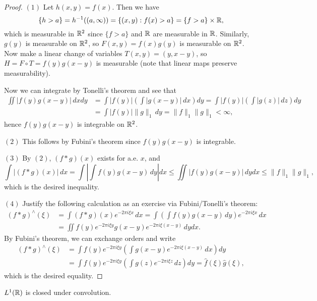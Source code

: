 \begin{proof}
  $(1)$ Let $h(x, y) = f(x)$. Then we have
  \[
    \{h > a\} = h^{-1}((a, \infty))
    = \{(x, y) : f(x) > a\}
    = \{f > a\} \times \mathbb{R},
  \]
  which is measurable in $\mathbb{R}^2$ since
  $\{f > a\}$ and $\mathbb{R}$ are measurable in
  $\mathbb{R}$. Similarly,
  $g(y)$ is measurable on $\mathbb{R}^2$, so
  $F(x, y) = f(x) g(y)$ is measurable
  on $\mathbb{R}^2$. Now make a linear change
  of variables $T(x, y) = (y, x - y)$,
  so $H = F \circ T = f(y) g(x - y)$ is
  measurable (note that linear maps
  preserve measurability).

  Now we can integrate by Tonelli's
  theorem and see that
  \begin{align*}
    \iint |f(y) g(x - y)|\, dx dy
    &= \int |f(y)| \left(\int |g(x - y)|\, dx\right) dy
    = \int |f(y)| \left(\int |g(z)|\, dz\right) dy \\
    &= \int |f(y)| \|g\|_1\, dy
    = \|f\|_1 \|g\|_1 < \infty,
  \end{align*}
  hence $f(y) g(x - y)$ is integrable
  on $\mathbb{R}^2$.

  $(2)$ This follows by Fubini's theorem
  since $f(y) g(x - y)$ is integrable.

  $(3)$ By $(2)$, $(f * g)(x)$ exists
  for a.e. $x$, and
  \[
    \int |(f * g)(x)|\, dx
    = \int \left|\int f(y) g(x - y)\, dy\right| dx
    \le \iint |f(y) g(x - y)|\, dy dx
    \le \|f\|_1 \|g\|_1,
  \]
  which is the desired inequality.

  $(4)$ Justify the following calculation
  as an exercise via Fubini/Tonelli's theorem:
  \begin{align*}
    (f * g)^\wedge(\xi)
    &= \int (f * g)(x) e^{-2\pi i \xi x}\, dx
    = \int \left(\int f(y) g(x - y)\, dy\right) e^{-2\pi i \xi x}\, dx \\
    &= \iint f(y) e^{-2\pi i \xi y}
    g(x - y) e^{-2\pi i \xi (x - y)}\, dy dx.
  \end{align*}
  By Fubini's theorem, we can exchange
  orders and write
  \begin{align*}
    (f * g)^\wedge(\xi)
    &= \int f(y) e^{-2\pi i \xi y}
    \left(\int g(x - y) e^{-2\pi i \xi (x - y)}\, dx\right) dy \\
    &= \int f(y) e^{-2\pi i \xi y} \left(\int g(z) e^{-2\pi i \xi z}\, dz\right) dy
    = \widehat{f}(\xi) \widehat{g}(\xi),
  \end{align*}
  which is the desired equality.
\end{proof}

\begin{corollary}
  $L^1(\mathbb{R})$ is closed under convolution.
\end{corollary}


